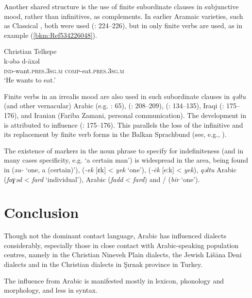 \documentclass[output=paper]{langsci/langscibook}
\begin{document}
Another shared structure is the use of finite subordinate clauses in subjunctive mood, rather than infinitives, as complements. In earlier Aramaic varieties, such as Classical , both were used (\citealt{Nöldeke1904Syriac}: 224–226), but in  only finite verbs are used, as in example (\ref{bkm:Ref534226048}).

\ea\label{bkm:Ref534226048}Christian Telkepe \\
\gll k-əbə       d-āxəl\\
    \textsc{ind-}\textup{want.}\textsc{pres}.\textsc{3sg.m} \textsc{comp}\textup{{}-eat.}\textsc{pres}.\textsc{3sg.m}\\
\glt ‘He wants to eat.’\z

Finite verbs in an irrealis mood are also used in such subordinate clauses in \textit{qəltu} (and other vernacular) Arabic (e.g. \citealt{Jastrow1990book}: 65),  (\citealt{MacKenzie1961}: 208–209),  (\citealt{MacKenzie1961}: 134–135), Iraqi  (\citealt{Bulut2007}: 175–176), and Iranian  (Fariba Zamani, personal communication). The development in  is attributed to  influence (\citealt{Bulut2007}: 175–176). This parallels the loss of the {infinitive} and its replacement by finite verb forms in the Balkan Sprachbund (see, e.g., \citealt{Joseph2009}).

The existence of markers in the {noun phrase} to specify for indefiniteness (and in many cases specificity, e.g. ‘a certain man’) is widespread in the area, being found in  (\textit{xa-} ‘one, a (certain)’),  (\textit{\nobreakdash-ek} [ɛk] < \textit{yek} `one'),  (\textit{\nobreakdash-ēk} [eːk] < \textit{yek}), \textit{qəltu} Arabic (\textit{faɣəd} < \textit{fard} `individual'),  Arabic (\textit{fadd} < \textit{fard}) and / (\textit{bir} `one').


\section{Conclusion}

Though not the dominant contact language, Arabic has influenced  dialects considerably, especially those in close contact with Arabic-speaking population centres, namely in the Christian Nineveh Plain dialects, the Jewish Lišāna Deni dialects and in the Christian dialects in Şırnak province in Turkey.

The influence from Arabic is manifested mostly in lexicon, phonology and morphology, and less in syntax.
\end{document}
